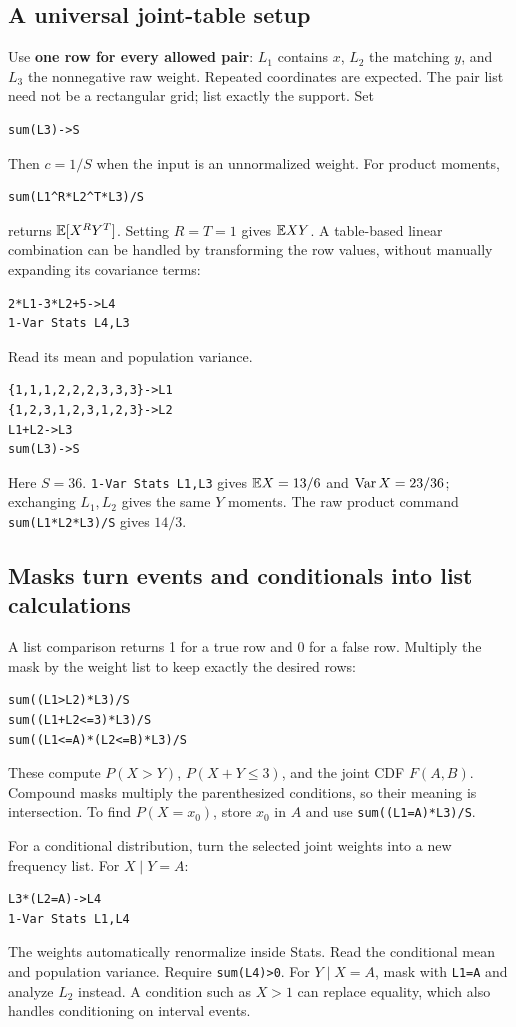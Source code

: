 \subsection{A universal joint-table setup}
Use \textbf{one row for every allowed pair}: $L_1$ contains $x$, $L_2$ the matching $y$, and $L_3$ the nonnegative raw weight. Repeated coordinates are expected. The pair list need not be a rectangular grid; list exactly the support. Set
\begin{verbatim}
sum(L3)->S
\end{verbatim}
Then $c=1/S$ when the input is an unnormalized weight. For product moments,
\begin{verbatim}
sum(L1^R*L2^T*L3)/S
\end{verbatim}
returns $\mathbb E[X^RY^T]$. Setting $R=T=1$ gives $\mathbb E XY$. A table-based linear combination can be handled by transforming the row values, without manually expanding its covariance terms:
\begin{verbatim}
2*L1-3*L2+5->L4
1-Var Stats L4,L3
\end{verbatim}
Read its mean and population variance.

\begin{example}
\begin{verbatim}
{1,1,1,2,2,2,3,3,3}->L1
{1,2,3,1,2,3,1,2,3}->L2
L1+L2->L3
sum(L3)->S
\end{verbatim}
Here $S=36$. \texttt{1-Var Stats L1,L3} gives $\mathbb E X=13/6$ and $\operatorname{Var} X=23/36$; exchanging $L_1,L_2$ gives the same $Y$ moments. The raw product command \texttt{sum(L1*L2*L3)/S} gives $14/3$.
\end{example}

\subsection{Masks turn events and conditionals into list calculations}
A list comparison returns 1 for a true row and 0 for a false row. Multiply the mask by the weight list to keep exactly the desired rows:
\begin{verbatim}
sum((L1>L2)*L3)/S
sum((L1+L2<=3)*L3)/S
sum((L1<=A)*(L2<=B)*L3)/S
\end{verbatim}
These compute $P(X>Y)$, $P(X+Y\le3)$, and the joint CDF $F(A,B)$. Compound masks multiply the parenthesized conditions, so their meaning is intersection. To find $P(X=x_0)$, store $x_0$ in $A$ and use \texttt{sum((L1=A)*L3)/S}.

For a conditional distribution, turn the selected joint weights into a new frequency list. For $X\mid Y=A$:
\begin{verbatim}
L3*(L2=A)->L4
1-Var Stats L1,L4
\end{verbatim}
The weights automatically renormalize inside Stats. Read the conditional mean and population variance. Require \texttt{sum(L4)>0}. For $Y\mid X=A$, mask with \texttt{L1=A} and analyze $L_2$ instead. A condition such as $X>1$ can replace equality, which also handles conditioning on interval events.

